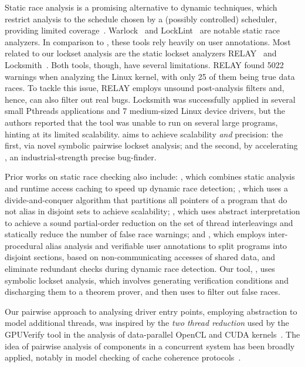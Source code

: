Static race analysis is a promising alternative to dynamic techniques, which restrict analysis to the schedule chosen by a (possibly controlled) scheduler, providing limited coverage~\cite{musuvathi2008finding}. Warlock~\cite{sterling1993warlock} and LockLint~\cite{oracle2010locklint} are notable static race analyzers.  In comparison to \whoop, these tools rely heavily on user annotations.
%
Most related to our lockset analysis are the static lockset analyzers RELAY~\cite{voung2007relay} and Locksmith~\cite{pratikakis2006locksmith}. Both tools, though, have several limitations. RELAY found 5022 warnings when analyzing the Linux kernel, with only 25 of them being true data races. To tackle this issue, RELAY employs unsound post-analysis filters and, hence, can also filter out real bugs. Locksmith was successfully applied in several small Pthreads applications and 7 medium-sized Linux device drivers, but the authors reported that the tool was unable to run on several large programs, hinting at its limited scalability. \whoop aims to achieve scalability \emph{and} precision: the first, via novel symbolic pairwise lockset analysis; and the second, by accelerating \corral, an industrial-strength precise bug-finder.

Prior works on static race checking also include: \cite{choi2002efficient}, which combines static analysis and runtime access caching to speed up dynamic race detection; \cite{kahlon2007fast}, which uses a divide-and-conquer algorithm that partitions all pointers of a program that do not alias in disjoint sets to achieve scalability; \cite{kahlon2009semantic}, which uses abstract interpretation to achieve a sound partial-order reduction on the set of thread interleavings and statically reduce the number of false race warnings; and \cite{das2015section}, which employs inter-procedural alias analysis and verifiable user annotations to split programs into disjoint sections, based on non-communicating accesses of shared data, and eliminate redundant checks during dynamic race detection. Our tool, \whoop, uses symbolic lockset analysis, which involves generating verification conditions and discharging them to a theorem prover, and then uses \corral to filter out false races. 

Our pairwise approach to analysing driver entry points, employing abstraction to model additional threads, was inspired by the \emph{two thread reduction} used by the GPUVerify tool in the analysis of data-parallel OpenCL and CUDA kernels~\cite{gpuverify,bardsley2014engineering}.  The idea of pairwise analysis of components in a concurrent system has been broadly applied, notably in model checking of cache coherence protocols~\cite{mcmillan1999verification}.
